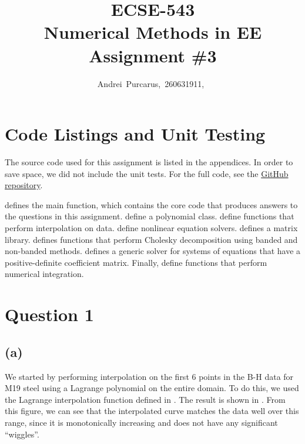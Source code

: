 \documentclass[journal,hidelinks]{IEEEtran}
\title{ECSE-543 \\ Numerical Methods in EE \\ Assignment \#3}
\author{Andrei~Purcarus,~260631911,~\IEEEmembership{McGill~University}}
\begin{document}
\sloppy

\maketitle

\section*{Code Listings and Unit Testing}

The source code used for this assignment is listed in the appendices. In order to save space, we did not include the unit tests. For the full code, see the \href{https://github.com/Gripnook/ECSE543-F17-A3}{GitHub repository}.

 defines the main function, which contains the core code that produces answers to the questions in this assignment.  define a polynomial class.  define functions that perform interpolation on data.  define nonlinear equation solvers.  defines a matrix library.  defines functions that perform Cholesky decomposition using banded and non-banded methods.  defines a generic solver for systems of equations that have a positive-definite coefficient matrix. Finally,  define functions that perform numerical integration.

\section*{Question 1}

\subsection*{(a)}

We started by performing interpolation on the first $6$ points in the B-H data for M19 steel using a Lagrange polynomial on the entire domain. To do this, we used the Lagrange interpolation function defined in . The result is shown in . From this figure, we can see that the interpolated curve matches the data well over this range, since it is monotonically increasing and does not have any significant ``wiggles''.
\end{document}
